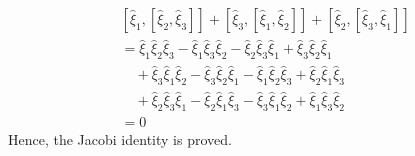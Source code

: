 \begin{align*}
     &
    \left[\widehat{\xi}_{1},\left[\widehat{\xi}_{2}, \widehat{\xi}_{3}\right]\right]+\left[\widehat{\xi}_{3},\left[\widehat{\xi}_{1}, \widehat{\xi}_{2}\right]\right]+\left[\widehat{\xi}_{2},\left[\widehat{\xi}_{3}, \widehat{\xi}_{1}\right]\right]
    \\ & =
    \widehat{\xi}_{1} \widehat{\xi}_{2} \widehat{\xi}_{3}-\widehat{\xi}_{1} \widehat{\xi}_{3} \widehat{\xi}_{2}-\widehat{\xi}_{2} \widehat{\xi}_{3} \widehat{\xi}_{1}+\widehat{\xi}_{3} \widehat{\xi}_{2} \widehat{\xi}_{1}
    \\ & \quad +
    \widehat{\xi}_{3} \widehat{\xi}_{1} \widehat{\xi}_{2}-\widehat{\xi}_{3} \widehat{\xi}_{2} \widehat{\xi}_{1}-\widehat{\xi}_{1} \widehat{\xi}_{2} \widehat{\xi}_{3}+\widehat{\xi}_{2} \widehat{\xi}_{1} \widehat{\xi}_{3}
    \\ & \quad +
    \widehat{\xi}_{2} \widehat{\xi}_{3} \widehat{\xi}_{1}-\widehat{\xi}_{2} \widehat{\xi}_{1} \widehat{\xi}_{3}-\widehat{\xi}_{3} \widehat{\xi}_{1} \widehat{\xi}_{2}+\widehat{\xi}_{1} \widehat{\xi}_{3} \widehat{\xi}_{2}
    \\ & =
    0
\end{align*}
Hence, the Jacobi identity is proved.
